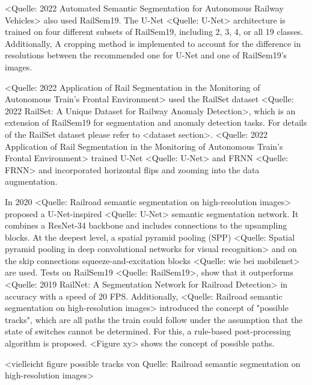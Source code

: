 <Quelle: 2022 Automated Semantic Segmentation for Autonomous Railway Vehicles> also used RailSem19.
The U-Net <Quelle: U-Net> architecture is trained on four different subsets of RailSem19, including 2, 3, 4, or all 19 classes.
Additionally, A cropping method is implemented to account for the difference in resolutions between the recommended one for U-Net and one of RailSem19's images.

<Quelle: 2022 Application of Rail Segmentation in the Monitoring of Autonomous Train’s Frontal Environment> used the RailSet dataset <Quelle: 2022 RailSet: A Unique Dataset for Railway Anomaly Detection>, which is an extension of RailSem19 for segmentation and anomaly detection tasks.
For details of the RailSet dataset please refer to <dataset section>.
<Quelle: 2022 Application of Rail Segmentation in the Monitoring of Autonomous Train’s Frontal Environment> trained U-Net <Quelle: U-Net> and FRNN <Quelle: FRNN> and incorporated horizontal flips and zooming into the data augmentation.

In 2020 <Quelle: Railroad semantic segmentation on high-resolution images> proposed a U-Net-inspired <Quelle: U-Net> semantic segmentation network.
It combines a ResNet-34 backbone and includes connections to the upsampling blocks.
At the deepest level, a spatial pyramid pooling (SPP) <Quelle: Spatial pyramid pooling in deep convolutional networks for visual recognition> and on the skip connections squeeze-and-excitation blocks <Quelle: wie bei mobilenet> are used.
Tests on RailSem19 <Quelle: RailSem19>, show that it outperforms <Quelle: 2019 RailNet: A Segmentation Network for Railroad Detection> in accuracy with a speed of 20 FPS.
Additionally, <Quelle: Railroad semantic segmentation on high-resolution images> introduced the concept of "possible tracks", which are all paths the train could follow under the assumption that the state of switches cannot be determined.
For this, a rule-based post-processing algorithm is proposed. <Figure xy> shows the concept of possible paths.

\vspace{1cm}

<vielleicht figure possible tracks von Quelle: Railroad semantic segmentation on high-resolution images>

\vspace{1cm}

